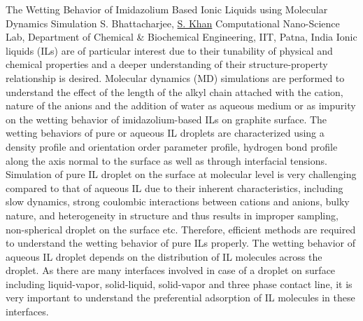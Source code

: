 
    \begin{abstract_online}{The Wetting Behavior of Imidazolium Based Ionic Liquids using Molecular Dynamics Simulation}{%
        S. Bhattacharjee, \underline{S. Khan}}{%
        \IStag}{%
         Computational Nano-Science Lab, Department of Chemical & Biochemical Engineering, IIT, Patna, India}
    Ionic liquids (ILs) are of particular interest due to their tunability of physical and chemical properties and a deeper understanding of their structure-property relationship is desired. Molecular dynamics (MD) simulations are performed to understand the effect of the length of the alkyl chain attached with the cation, nature of the anions and the addition of water as aqueous medium or as impurity on the wetting behavior of imidazolium-based ILs on graphite surface. The wetting behaviors of pure or aqueous IL droplets are characterized using a density profile and orientation order parameter profile, hydrogen bond profile along the axis normal to the surface as well as through interfacial tensions.  Simulation of pure IL droplet on the surface at molecular level is very challenging compared to that of aqueous IL due to their inherent characteristics, including slow dynamics, strong coulombic interactions between cations and anions, bulky nature, and heterogeneity in structure and thus results in improper sampling, non-spherical droplet on the surface etc. Therefore, efficient methods are required to understand the wetting behavior of pure ILs properly. The wetting behavior of aqueous IL droplet depends on the distribution of IL molecules across the droplet. As there are many interfaces involved in case of a droplet on surface including liquid-vapor, solid-liquid, solid-vapor and three phase contact line, it is very important to understand the preferential adsorption of IL molecules in these interfaces. 
    
    \end{abstract_online}
    